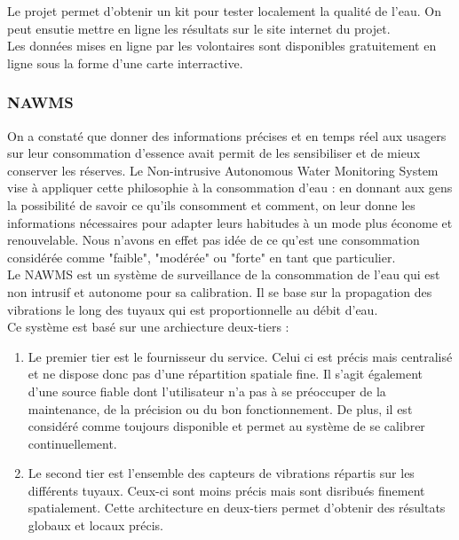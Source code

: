 \documentclass[10pt, article]{llncs}
\begin{document}
			Le projet permet d'obtenir un kit pour tester localement la qualité de l'eau. On peut ensutie mettre en ligne les résultats sur le site internet du projet.\\
			Les données mises en ligne par les volontaires sont disponibles gratuitement en ligne sous la forme d'une carte interractive.
			
		\subsubsection{NAWMS}
			On a constaté que donner des informations précises et en temps réel aux usagers sur leur consommation d'essence avait permit de les sensibiliser et de mieux conserver les réserves. Le Non-intrusive Autonomous Water Monitoring System vise à appliquer cette philosophie à la consommation d'eau : en donnant aux gens la possibilité de savoir ce qu'ils consomment et comment, on leur donne les informations nécessaires pour adapter leurs habitudes à un mode plus économe et renouvelable. Nous n'avons en effet pas idée de ce qu'est une consommation considérée comme "faible", "modérée" ou "forte" en tant que particulier.\\
			Le NAWMS est un système de surveillance de la consommation de l'eau qui est non intrusif et autonome pour sa calibration. Il se base sur la propagation des vibrations le long des tuyaux qui est proportionnelle au débit d'eau.\\
			Ce système est basé sur une archiecture deux-tiers :
			\begin{enumerate}
				\item Le premier tier est le fournisseur du service. Celui ci est précis mais centralisé et ne dispose donc pas d'une répartition spatiale fine. Il s'agit également d'une source fiable dont l'utilisateur n'a pas à se préoccuper de la maintenance, de la précision ou du bon fonctionnement. De plus, il est considéré comme toujours disponible et permet au système de se calibrer continuellement.
				\item Le second tier est l'ensemble des capteurs de vibrations répartis sur les différents tuyaux. Ceux-ci sont moins précis mais sont disribués finement spatialement. Cette architecture en deux-tiers permet d'obtenir des résultats globaux et locaux précis.
			\end{enumerate}
\end{document}
